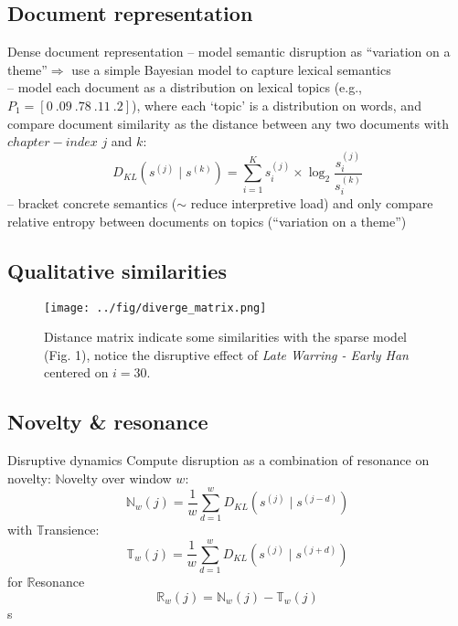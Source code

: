 \subsection{Document representation}
\begin{frame}{Dense document representation}
-- model semantic disruption as ``variation on a theme''$\Rightarrow$ use a simple Bayesian model to capture lexical semantics\\
\smallskip
-- model each document as a distribution on lexical topics (e.g., {\small$P_1 = [0~.09~.78~.11~.2]$)}, where each `topic' is a distribution on words, and compare document similarity as the distance between any two documents with $chapter-index$ $j$ and $k$:\\
\smallskip
\begin{equation*}
D_{KL} (s^{(j)} \mid s^{(k)}) = \sum_{i = 1}^{K} s_i^{(j)} \times \log_2 \frac{s_i^{(j)}}{s_i^{(k)}}
\end{equation*}
-- bracket concrete semantics ($\sim$ reduce interpretive load) and only compare relative entropy between documents on topics (``variation on a theme'')\\
\end{frame}

\subsection{Qualitative similarities}
\begin{frame}
\begin{figure}
	\centering
	\texttt{[image: ../fig/diverge\_matrix.png]}
	\caption{Distance matrix indicate some similarities with the sparse model (Fig. 1), notice the disruptive effect of \emph{Late Warring - Early Han} centered on $i = 30$.}
\end{figure}
\end{frame}

{\nologo
\subsection{Novelty \& resonance}
\begin{frame}{Disruptive dynamics}
Compute disruption as a combination of resonance on novelty:
\medskip
$\mathbb{N}$ovelty over window $w$:
\begin{equation*}
	\mathbb{N}_w (j) =  \frac{1}{w} \sum_{d=1}^{w}  D_{KL} (s^{(j)} \mid s^{(j - d)})
\end{equation*}
with $\mathbb{T}$ransience:
\begin{equation*}
\mathbb{T}_w (j) =  \frac{1}{w} \sum_{d=1}^{w}  D_{KL} (s^{(j)} \mid s^{(j + d)})
\end{equation*}
for $\mathbb{R}$esonance
\begin{equation*}
\mathbb{R}_w (j) = \mathbb{N}_w (j) - \mathbb{T}_w (j)
\end{equation*}s
\end{frame}
}

